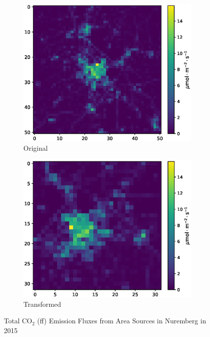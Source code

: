\begin{figure}[htb]
    \centering
    \begin{subfigure}{0.4\textwidth}
        \centering
        \includegraphics[width=\linewidth]{figures/03_dataset/nuernberg/nuernberg.eps}
        \caption{Original}
    \end{subfigure}
    \begin{subfigure}{0.4\textwidth}
        \centering
        \includegraphics[width=\linewidth]{figures/03_dataset/nuernberg/nuernberg_transformed.eps}
        \caption{Transformed}
    \end{subfigure}
    \caption{Total $\text{CO}_2$ (ff) Emission Fluxes from Area Sources in Nuremberg in 2015 \parencite{TNO_HighRes15}}
    \label{fig:nuernberg_emissions}
\end{figure}

